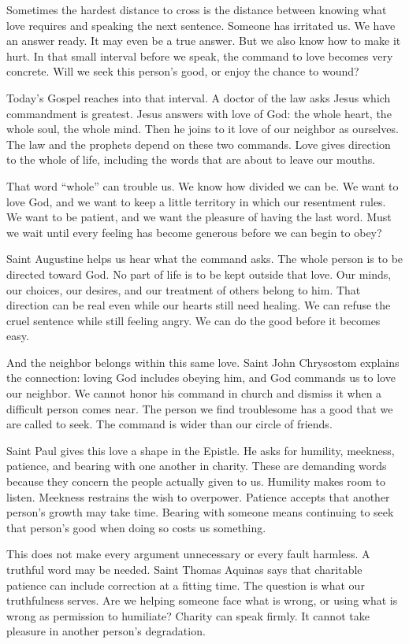 Sometimes the hardest distance to cross is the distance between knowing what love requires and speaking the next sentence. Someone has irritated us. We have an answer ready. It may even be a true answer. But we also know how to make it hurt. In that small interval before we speak, the command to love becomes very concrete. Will we seek this person's good, or enjoy the chance to wound?

Today's Gospel reaches into that interval. A doctor of the law asks Jesus which commandment is greatest. Jesus answers with love of God: the whole heart, the whole soul, the whole mind. Then he joins to it love of our neighbor as ourselves. The law and the prophets depend on these two commands. Love gives direction to the whole of life, including the words that are about to leave our mouths.

That word ``whole'' can trouble us. We know how divided we can be. We want to love God, and we want to keep a little territory in which our resentment rules. We want to be patient, and we want the pleasure of having the last word. Must we wait until every feeling has become generous before we can begin to obey?

Saint Augustine helps us hear what the command asks. The whole person is to be directed toward God. No part of life is to be kept outside that love. Our minds, our choices, our desires, and our treatment of others belong to him. That direction can be real even while our hearts still need healing. We can refuse the cruel sentence while still feeling angry. We can do the good before it becomes easy.

And the neighbor belongs within this same love. Saint John Chrysostom explains the connection: loving God includes obeying him, and God commands us to love our neighbor. We cannot honor his command in church and dismiss it when a difficult person comes near. The person we find troublesome has a good that we are called to seek. The command is wider than our circle of friends.

Saint Paul gives this love a shape in the Epistle. He asks for humility, meekness, patience, and bearing with one another in charity. These are demanding words because they concern the people actually given to us. Humility makes room to listen. Meekness restrains the wish to overpower. Patience accepts that another person's growth may take time. Bearing with someone means continuing to seek that person's good when doing so costs us something.

This does not make every argument unnecessary or every fault harmless. A truthful word may be needed. Saint Thomas Aquinas says that charitable patience can include correction at a fitting time. The question is what our truthfulness serves. Are we helping someone face what is wrong, or using what is wrong as permission to humiliate? Charity can speak firmly. It cannot take pleasure in another person's degradation.

